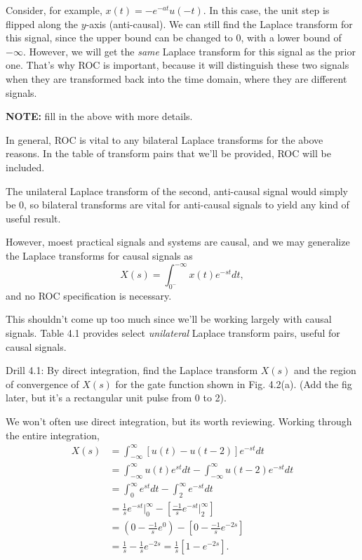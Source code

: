 \documentclass{article}
\begin{document}
Consider, for example, \(x(t) = -e^{-at}u(-t)\). In this case, the unit step is flipped along the \(y\)-axis (anti-causal). We can still find the Laplace transform for this signal, since the upper bound can be changed to \(0\), with a lower bound of \(-\infty\). However, we will get the \textit{same} Laplace transform for this signal as the prior one. That's why ROC is important, because it will distinguish these two signals when they are transformed back into the time domain, where they are different signals.

\textbf{NOTE:} fill in the above with more details.

In general, ROC is vital to any bilateral Laplace transforms for the above reasons. In the table of transform pairs that we'll be provided, ROC will be included. 

The unilateral Laplace transform of the second, anti-causal signal would simply be \(0\), so bilateral transforms are vital for anti-causal signals to yield any kind of useful result.

However, moest practical signals and systems are causal, and we may generalize the Laplace transforms for causal signals as 
\[
	X(s) = \int_{0^-}^{-\infty}x(t)e^{-st}dt,
\]
and no ROC specification is necessary.

This shouldn't come up too much since we'll be working largely with causal signals. Table 4.1 provides select \textit{unilateral} Laplace transform pairs, useful for causal signals.

Drill 4.1: By direct integration, find the Laplace transform \(X(s)\) and the region of convergence of \(X(s)\) for the gate function shown in Fig. 4.2(a). (Add the fig later, but it's a rectangular unit pulse from 0 to 2). 

We won't often use direct integration, but its worth reviewing. Working through the entire integration, 
\begin{align*}
	X(s) &= \int_{-\infty}^{\infty} [u(t) - u(t-2)]e^{-st}dt \\
			 &=\int_{-\infty}^{\infty} u(t) e^{st} dt - \int_{-\infty}^{\infty}u(t-2)e^{-st}dt \\
			 &=\int_{0}^{\infty}e^{st}dt - \int_{2}^{\infty}e^{-st}dt \\
			 &=\frac{1}{s}e^{-st} \Big|_0^\infty - [\frac{-1}{s}e^{-st}\Big|_2^\infty] \\
			 &=(0-\frac{-1}{s}e^0)-[0-\frac{-1}{s}e^{-2s}] \\
			 &=\frac{1}{s} - \frac{1}{s}e^{-2s}=\frac{1}{s}[1-e^{-2s}].
\end{align*}
\end{document}
